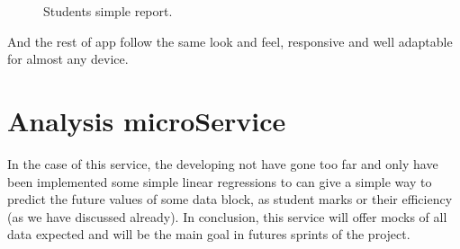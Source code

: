 \begin{figure}[H]
\begin{minipage}{.5\textwidth}
  \caption{Students simple report.}
\end{minipage}
\end{figure}

\noindent And the rest of app follow the same look and feel, responsive and well adaptable
for almost any device.

\section{Analysis microService}

In the case of this service, the developing not have gone too far and only have
been implemented some simple linear regressions to can give a simple way to
predict the future values of some data block, as student marks or their efficiency
(as we have discussed already).
\intro
In conclusion, this service will offer mocks of all data expected and will be
the main goal in futures sprints of the project.
